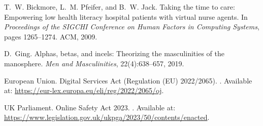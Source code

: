 \documentclass[12pt]{article}
\begin{document}
\begin{thebibliography}{99}
T.~W. Bickmore, L.~M. Pfeifer, and B.~W. Jack.
\newblock Taking the time to care: Empowering low health literacy hospital patients with virtual nurse agents.
\newblock In \emph{Proceedings of the SIGCHI Conference on Human Factors in Computing Systems}, pages 1265--1274. ACM, 2009.

D.~Ging.
\newblock Alphas, betas, and incels: Theorizing the masculinities of the manosphere.
\newblock \emph{Men and Masculinities}, 22(4):638--657, 2019.

European Union.
\newblock Digital Services Act (Regulation (EU) 2022/2065).
. Available at: \url{https://eur-lex.europa.eu/eli/reg/2022/2065/oj}.

UK Parliament.
\newblock Online Safety Act 2023.
. Available at: \url{https://www.legislation.gov.uk/ukpga/2023/50/contents/enacted}.

\end{thebibliography}
\end{document}
